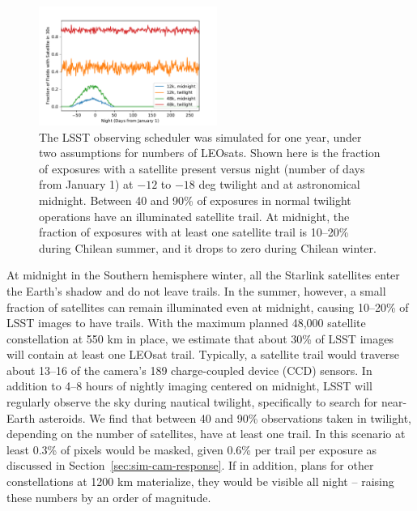 \documentclass[twocolumn,trackchanges]{aastex63}
\begin{document}
\begin{figure}[ht!]
\includegraphics[trim=+1cm 0 0 0, width=0.52\textwidth]{frac_with_sats.pdf}
\caption{The LSST observing scheduler was simulated for one year, under two assumptions for numbers of LEOsats.
Shown here is the fraction of exposures with a satellite present versus night (number of days from January 1) at $-12$ to $-18$ deg twilight and at astronomical midnight.
Between 40 and 90\% of exposures in normal twilight operations have an illuminated satellite trail. At midnight, the fraction of exposures with at least one satellite trail is 10--20\% during Chilean summer, and it drops to zero during Chilean winter.
\label{fig:expfraction}}
\end{figure}




At midnight in the Southern hemisphere winter, all the Starlink satellites enter the Earth's shadow and do not leave trails. In the summer, however, a small fraction of satellites can remain illuminated even at midnight, causing 10--20\% of LSST images to have trails. With the maximum planned 48,000 satellite constellation at 550 km in place, we estimate that about 30\% of LSST images will contain at least one LEOsat trail. Typically, a satellite trail would traverse about 13--16 of the camera's 189 charge-coupled device (CCD) sensors.
In addition to 4--8 hours of nightly imaging centered on midnight, LSST will regularly observe the sky during nautical twilight, specifically to search for near-Earth asteroids. We find that between 40 and 90\% observations taken in twilight, depending on the number of satellites, have at least one trail. In this scenario at least 0.3\% of pixels would be masked, given 0.6\% per trail per exposure as discussed in Section~\ref{sec:sim-cam-response}. 
If in addition, plans for other constellations at 1200 km materialize, they would be visible all night -- raising these numbers by an order of magnitude.  %
\end{document}
